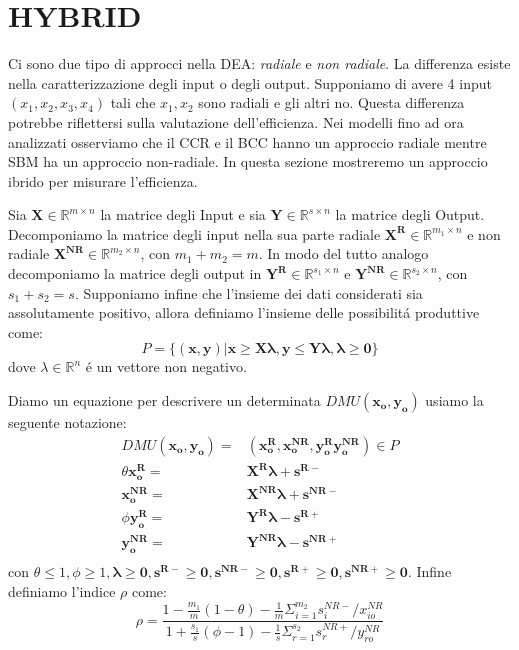 \section{HYBRID}
\bigskip
Ci sono due tipo di approcci nella DEA: \emph{radiale} e \emph{non radiale}. La differenza esiste nella caratterizzazione degli input o degli output. Supponiamo di avere 4 input $(x_{1},x_{2},x_{3},x_{4})$ tali che $x_{1}, x_{2}$ sono radiali e gli altri no. Questa differenza potrebbe riflettersi sulla valutazione dell'efficienza. Nei modelli fino ad ora analizzati osserviamo che il CCR e il BCC hanno un approccio radiale mentre SBM ha un approccio non-radiale. In questa sezione mostreremo un approccio ibrido per misurare l'efficienza.
\begin{definiz} Sia $\boldsymbol{X} \in \mathbb{R}^{m \times n}$ la matrice degli Input e sia $\boldsymbol{Y} \in \mathbb{R}^{s \times n}$  la matrice degli Output. Decomponiamo la matrice degli input nella sua parte radiale $\boldsymbol{X^R} \in \mathbb{R}^{m_{1} \times n}$ e non radiale $\boldsymbol{X^{NR}} \in \mathbb{R}^{m_{2} \times n}$, con $m_{1} + m_{2} = m$. In modo del tutto analogo decomponiamo la matrice degli output in $\boldsymbol{Y^R} \in \mathbb{R}^{s_{1} \times n}$ e $\boldsymbol{Y^{NR}} \in \mathbb{R}^{s_{2} \times n}$, con $s_{1} + s_{2} = s$. Supponiamo infine che l'insieme dei dati considerati sia assolutamente positivo, allora definiamo l'insieme delle possibilit\'a produttive come:
\begin{equation}
P = \lbrace (\boldsymbol{x,y}) | \boldsymbol{x \geq X\lambda, y \leq Y\lambda , \lambda \geq 0 }\rbrace
\end{equation}
dove $\lambda \in \mathbb{R}^n$ \'e un vettore non negativo.
\end{definiz}
\begin{oss}
Diamo un equazione per descrivere un determinata $DMU(\boldsymbol{x_{o}, y_{o}})$ usiamo la seguente notazione: 
\begin{equation} \label{EQ:hybrid}
\begin{split}
DMU(\boldsymbol{x_{o}, y_{o}}) = & (\boldsymbol{x_{o}^R, x_{o}^{NR}, y_{o}^R y_{o}^{NR}}) \in P \\
\theta\boldsymbol{x_{o}^R} = & \boldsymbol{X^R\lambda + s^{R-}}\\
\boldsymbol{x_{o}^{NR}} = & \boldsymbol{X^{NR}\lambda + s^{NR-}}\\
\phi\boldsymbol{y_{o}^R} = & \boldsymbol{Y^R\lambda - s^{R+}}\\
\boldsymbol{y_{o}^{NR}} = & \boldsymbol{Y^{NR}\lambda - s^{NR+}}\\
\end{split}
\end{equation}
con $\theta \leq 1, \phi \geq 1, \boldsymbol{\lambda \geq 0, s^{R-} \geq 0, s^{NR-} \geq 0, s^{R+} \geq 0, s^{NR+} \geq 0}$.
Infine definiamo l'indice $\rho$ come:
\begin{equation}
\rho = \frac{1 - \frac{m_{1}}{m}(1 - \theta) - \frac{1}{m}\Sigma^{m_{2}}_{i=1} s^{NR-}_{i} / x_{io}^{NR}}{1 + \frac{s_{1}}{s}(\phi - 1) - \frac{1}{s}\Sigma^{s_{2}}_{r=1} s^{NR+}_{r} / y_{ro}^{NR}}
\end{equation}
\end{oss}
